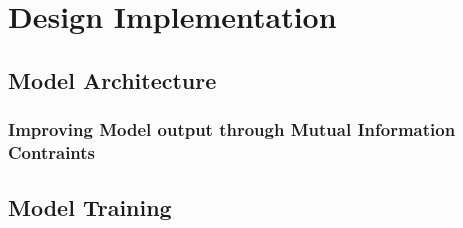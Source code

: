 %
%
%

\chapter{Design Implementation}

\section{Model Architecture}

\subsection{Improving Model output through Mutual Information Contraints}

\section{Model Training}
